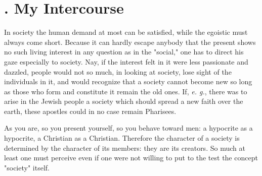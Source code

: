 \documentclass[a4paper]{book}
\begin{document}
\section[2. My Intercourse]{. My Intercourse}

In society the human demand at most can be satisfied, while the egoistic must 
always come short. Because it can hardly escape anybody that the present shows 
no such living interest in any question as in the "{}social,"{} one has to 
direct his gaze especially to society. Nay, if the interest felt in it were 
less passionate and dazzled, people would not so much, in looking at society, 
lose sight of the individuals in it, and would recognize that a society cannot 
become new so long as those who form and constitute it remain the old ones. 
If, \textit{e. g.}, there was to arise in the Jewish people a society which 
should spread a new faith over the earth, these apostles could in no case 
remain Pharisees.

As you are, so you present yourself, so you behave toward men: a hypocrite as 
a hypocrite, a Christian as a Christian. Therefore the character of a society 
is determined by the character of its members: they are its creators. So much 
at least one must perceive even if one were not willing to put to the test the 
concept "{}society"{} itself.
\end{document}
